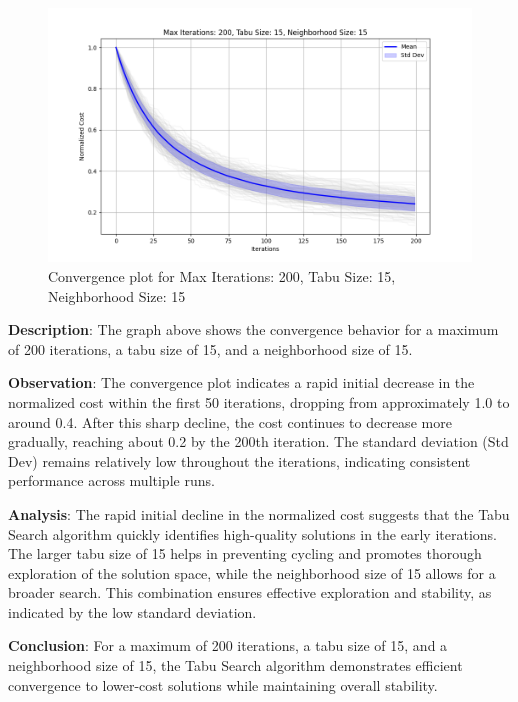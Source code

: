 \documentclass{article}
\begin{document}
    \begin{figure}[H]
        \centering
        \includegraphics[width=\textwidth]{tabu_search/max_iter_200_tabu_size_15_neighborhood_size_15}
        \caption{Convergence plot for Max Iterations: 200, Tabu Size: 15, Neighborhood Size: 15}
        \label{fig:ts_200_15_15}
    \end{figure}

    \textbf{Description}: The graph above shows the convergence behavior for a maximum of 200 iterations, a tabu size of 15, and a neighborhood size of 15.

    \textbf{Observation}: The convergence plot indicates a rapid initial decrease in the normalized cost within the first 50 iterations, dropping from approximately 1.0 to around 0.4. After this sharp decline, the cost continues to decrease more gradually, reaching about 0.2 by the 200th iteration. The standard deviation (Std Dev) remains relatively low throughout the iterations, indicating consistent performance across multiple runs.

    \textbf{Analysis}: The rapid initial decline in the normalized cost suggests that the Tabu Search algorithm quickly identifies high-quality solutions in the early iterations. The larger tabu size of 15 helps in preventing cycling and promotes thorough exploration of the solution space, while the neighborhood size of 15 allows for a broader search. This combination ensures effective exploration and stability, as indicated by the low standard deviation.

    \textbf{Conclusion}: For a maximum of 200 iterations, a tabu size of 15, and a neighborhood size of 15, the Tabu Search algorithm demonstrates efficient convergence to lower-cost solutions while maintaining overall stability.
\end{document}
